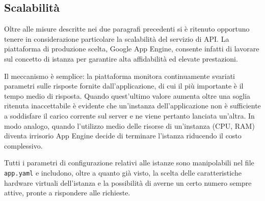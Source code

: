 \subsection{Scalabilità}
Oltre alle misure descritte nei due paragrafi precedenti si è ritenuto opportuno tenere in considerazione particolare la scalabilità del servizio di API. La piattaforma di produzione scelta, Google App Engine, consente infatti di lavorare sul concetto di istanza per garantire alta affidabilità ed elevate prestazioni.

Il meccanismo è semplice: la piattaforma monitora continuamente svariati parametri sulle risposte fornite dall'applicazione, di cui il più importante è il tempo medio di risposta. Quando quest'ultimo valore aumenta oltre una soglia ritenuta inaccettabile è evidente che un'instanza dell'applicazione non è sufficiente a soddisfare il carico corrente sul server e ne viene pertanto lanciata un'altra. In modo analogo, quando l'utilizzo medio delle risorse di un'instanza (CPU, RAM) diventa irrisorio App Engine decide di terminare l'istanza riducendo il costo complessivo.

Tutti i parametri di configurazione relativi alle istanze sono manipolabili nel file \texttt{app.yaml} e includono, oltre a quanto già visto, la scelta delle caratteristiche hardware virtuali dell'istanza e la possibilità di averne un certo numero sempre attive, pronte a rispondere alle richieste.